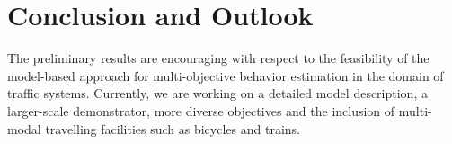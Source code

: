 \documentclass[conference]{../cls/IEEEtran}
\begin{document}
\section{Conclusion and Outlook}

The preliminary results are encouraging with respect to the feasibility of the model-based approach for multi-objective behavior estimation in the domain of traffic systems. Currently, we are working on a detailed model description, a larger-scale demonstrator, more diverse objectives and the inclusion of multi-modal travelling facilities such as bicycles and trains.



\end{document}
